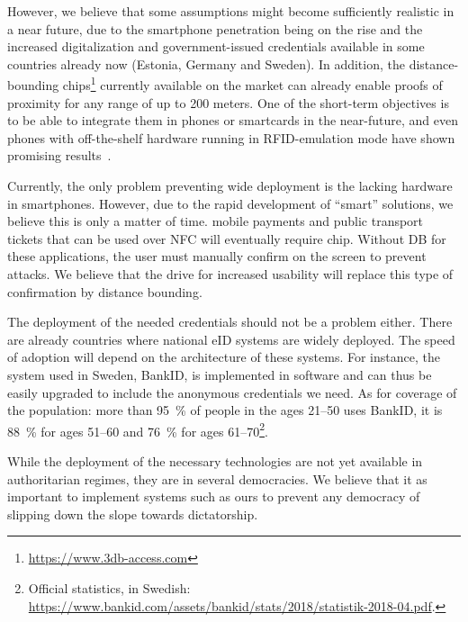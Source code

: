 However, we believe that some assumptions might become sufficiently realistic in a near future, due to the smartphone penetration being on the rise and the increased digitalization and government-issued credentials available in some countries already now (\eg Estonia, Germany and Sweden).
In addition, the distance-bounding chips\footnote{\url{https://www.3db-access.com}} currently available on the market can already enable proofs of proximity for any range of up to 200 meters.
One of the short-term objectives is to be able to integrate them in phones or smartcards in the near-future, and even phones with off-the-shelf hardware running in RFID-emulation mode have shown promising results~\cite{DBonSmartphones}.

Currently, the only problem preventing wide deployment is the lacking hardware 
in smartphones.
However, due to the rapid development of \enquote{smart} solutions, we believe 
this is only a matter of time.
\Eg mobile payments and public transport tickets that can be used over \ac{NFC} 
will eventually require  chip.
Without \ac{DB} for these applications, the user must manually confirm on the 
screen to prevent attacks.
We believe that the drive for increased usability will replace this type of 
confirmation by distance bounding.

The deployment of the needed credentials should not be a problem either.
There are already countries where national \ac{eID} systems are widely deployed.
The speed of adoption will depend on the architecture of these systems.
For instance, the system used in Sweden, BankID, is implemented in software and 
can thus be easily upgraded to include the anonymous credentials we need.
As for coverage of the population: more than \SI{95}{\%} of people in the ages 
21--50 uses BankID, it is \SI{88}{\%} for ages 51--60 and \SI{76}{\%} for ages 
61--70\footnote{%
  Official statistics, in Swedish:
  \url{https://www.bankid.com/assets/bankid/stats/2018/statistik-2018-04.pdf}.
}.

While the deployment of the necessary technologies are not yet available in 
authoritarian regimes, they are in several democracies.
We believe that it as important to implement systems such as ours to prevent any 
democracy of slipping down the slope towards dictatorship.


 
